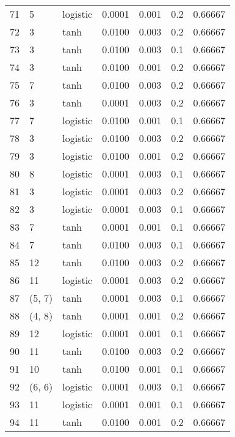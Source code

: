\begin{tabular}{lllrrrr}
71  &           5 &  logistic &  0.0001 &  0.001 &  0.2 &   0.66667 \\
72  &           3 &      tanh &  0.0100 &  0.003 &  0.2 &   0.66667 \\
73  &           3 &      tanh &  0.0100 &  0.003 &  0.1 &   0.66667 \\
74  &           3 &      tanh &  0.0100 &  0.001 &  0.2 &   0.66667 \\
75  &           7 &      tanh &  0.0100 &  0.003 &  0.2 &   0.66667 \\
76  &           3 &      tanh &  0.0001 &  0.003 &  0.2 &   0.66667 \\
77  &           7 &  logistic &  0.0100 &  0.001 &  0.1 &   0.66667 \\
78  &           3 &  logistic &  0.0100 &  0.003 &  0.2 &   0.66667 \\
79  &           3 &  logistic &  0.0100 &  0.001 &  0.2 &   0.66667 \\
80  &           8 &  logistic &  0.0001 &  0.003 &  0.1 &   0.66667 \\
81  &           3 &  logistic &  0.0001 &  0.003 &  0.2 &   0.66667 \\
82  &           3 &  logistic &  0.0001 &  0.003 &  0.1 &   0.66667 \\
83  &           7 &      tanh &  0.0001 &  0.001 &  0.1 &   0.66667 \\
84  &           7 &      tanh &  0.0100 &  0.003 &  0.1 &   0.66667 \\
85  &          12 &      tanh &  0.0100 &  0.003 &  0.2 &   0.66667 \\
86  &          11 &  logistic &  0.0001 &  0.003 &  0.2 &   0.66667 \\
87  &      (5, 7) &      tanh &  0.0001 &  0.003 &  0.1 &   0.66667 \\
88  &      (4, 8) &      tanh &  0.0001 &  0.001 &  0.2 &   0.66667 \\
89  &          12 &  logistic &  0.0001 &  0.001 &  0.1 &   0.66667 \\
90  &          11 &      tanh &  0.0100 &  0.003 &  0.2 &   0.66667 \\
91  &          10 &      tanh &  0.0100 &  0.001 &  0.1 &   0.66667 \\
92  &      (6, 6) &  logistic &  0.0001 &  0.003 &  0.1 &   0.66667 \\
93  &          11 &  logistic &  0.0001 &  0.001 &  0.1 &   0.66667 \\
94  &          11 &      tanh &  0.0100 &  0.001 &  0.2 &   0.66667 \\

\end{tabular}
